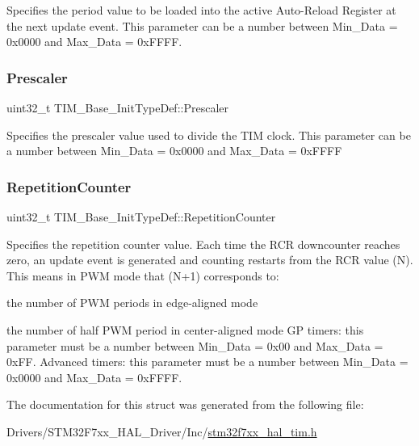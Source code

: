 Specifies the period value to be loaded into the active Auto-\/\+Reload Register at the next update event. This parameter can be a number between Min\+\_\+\+Data = 0x0000 and Max\+\_\+\+Data = 0x\+F\+F\+FF. \mbox{\label{struct_t_i_m___base___init_type_def_afc886119e6709bb576d25b5cf8d12d92}} 
\subsubsection{\texorpdfstring{Prescaler}{Prescaler}}
{\footnotesize\ttfamily uint32\+\_\+t T\+I\+M\+\_\+\+Base\+\_\+\+Init\+Type\+Def\+::\+Prescaler}

Specifies the prescaler value used to divide the T\+IM clock. This parameter can be a number between Min\+\_\+\+Data = 0x0000 and Max\+\_\+\+Data = 0x\+F\+F\+FF \mbox{\label{struct_t_i_m___base___init_type_def_aa949328175500fd1d112f64a4db5ae79}} 
\subsubsection{\texorpdfstring{RepetitionCounter}{RepetitionCounter}}
{\footnotesize\ttfamily uint32\+\_\+t T\+I\+M\+\_\+\+Base\+\_\+\+Init\+Type\+Def\+::\+Repetition\+Counter}

Specifies the repetition counter value. Each time the R\+CR downcounter reaches zero, an update event is generated and counting restarts from the R\+CR value (N). This means in P\+WM mode that (N+1) corresponds to\+:
\begin{DoxyItemize}
\item the number of P\+WM periods in edge-\/aligned mode
\item the number of half P\+WM period in center-\/aligned mode GP timers\+: this parameter must be a number between Min\+\_\+\+Data = 0x00 and Max\+\_\+\+Data = 0x\+FF. Advanced timers\+: this parameter must be a number between Min\+\_\+\+Data = 0x0000 and Max\+\_\+\+Data = 0x\+F\+F\+FF. 
\end{DoxyItemize}

The documentation for this struct was generated from the following file\+:\begin{DoxyCompactItemize}
\item 
Drivers/\+S\+T\+M32\+F7xx\+\_\+\+H\+A\+L\+\_\+\+Driver/\+Inc/\mbox{\hyperlink{stm32f7xx__hal__tim_8h}{stm32f7xx\+\_\+hal\+\_\+tim.\+h}}\end{DoxyCompactItemize}
